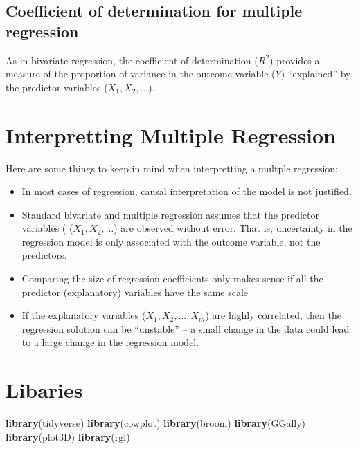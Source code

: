 \documentclass[]{book}
\newenvironment{Shaded}{\begin{snugshade}}{\end{snugshade}}
\newcommand{\KeywordTok}[1]{\textcolor[rgb]{0.13,0.29,0.53}{\textbf{#1}}}
\newcommand{\NormalTok}[1]{#1}
\theoremstyle{definition}
\theoremstyle{definition}
\theoremstyle{definition}
\theoremstyle{remark}
\begin{document}
\hypertarget{coefficient-of-determination-for-multiple-regression}{%
\subsection{Coefficient of determination for multiple
regression}\label{coefficient-of-determination-for-multiple-regression}}

As in bivariate regression, the coefficient of determination (\(R^2\))
provides a measure of the proportion of variance in the outcome variable
(\(Y\)) ``explained'' by the predictor variables (\(X_1, X_2, \ldots\)).

\hypertarget{interpretting-multiple-regression}{%
\section{Interpretting Multiple
Regression}\label{interpretting-multiple-regression}}

Here are some things to keep in mind when interpretting a multple
regression:

\begin{itemize}
\item
  In most cases of regression, causal interpretation of the model is not
  justified.
\item
  Standard bivariate and multiple regression assumes that the predictor
  variables ( (\(X_1, X_2, \ldots\)) are observed without error. That
  is, uncertainty in the regression model is only associated with the
  outcome variable, not the predictors.
\item
  Comparing the size of regression coefficients only makes sense if all
  the predictor (explanatory) variables have the same scale
\item
  If the explanatory variables (\(X_1, X_2,\ldots,X_m\)) are highly
  correlated, then the regression solution can be ``unstable'' -- a
  small change in the data could lead to a large change in the
  regression model.
\end{itemize}

\hypertarget{libaries}{%
\section{Libaries}\label{libaries}}

\begin{Shaded}
\begin{Highlighting}[]
\KeywordTok{library}\NormalTok{(tidyverse)}
\KeywordTok{library}\NormalTok{(cowplot)}
\KeywordTok{library}\NormalTok{(broom)}
\KeywordTok{library}\NormalTok{(GGally)}
\KeywordTok{library}\NormalTok{(plot3D)}
\KeywordTok{library}\NormalTok{(rgl)}
\end{Highlighting}
\end{Shaded}
\end{document}
